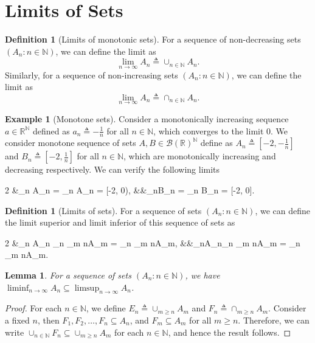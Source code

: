 \documentclass[letterpaper,10pt,english]{article}
\theoremstyle{plain}
\newtheorem{lem}[thm]{Lemma}
\theoremstyle{definition}
\newtheorem{defn}[thm]{Definition}
\newtheorem{exmp}[thm]{Example}
\theoremstyle{remark}
\newcommand{\EQ}[1]{\begin{equation*}#1\end{equation*}}
\newcommand{\meq}[2]{\begin{xalignat*}{#1}#2\end{xalignat*}}
\newcommand{\N}{\mathbb{N}}
\newcommand{\R}{\mathbb{R}}
\newcommand{\sB}{\mathscr{B}}
\renewcommand{\ge}{\geqslant}
\begin{document}
\section{Limits of Sets}
\begin{defn}[Limits of monotonic sets]
For a sequence of non-decreasing sets $(A_n: n \in \N)$, we can define the limit as 
\EQ{
\lim_{n \to \infty}A_n \triangleq \cup_{n \in \N}A_n.
}
Similarly, for a sequence of non-increasing sets $(A_n: n \in \N)$, we can define the limit as 
\EQ{
\lim_{n \to \infty}A_n \triangleq \cap_{n \in \N}A_n.
}
\end{defn}
\begin{shaded}
\begin{exmp}[Monotone sets]
Consider a monotonically increasing sequence $a \in \R^\N$ defined as $a_n \triangleq -\frac{1}{n}$ for all  $n \in \N$,  
which converges to the limit $0$.  
We consider monotone sequence of sets $A, B \in \sB(\R)^\N$ define as $A_n \triangleq [-2, -\frac{1}{n}]$ and $B_n \triangleq [-2, \frac{1}{n}]$  for all $n \in \N$, which are monotonically increasing and decreasing respectively. 
We can verify the following limits 
\meq{2}{
&\lim_n A_n = \cup_{n \in \N}A_n = [-2, 0), &&\lim_nB_n = \cap_{n \in \N}B_n = [-2, 0].
}
\end{exmp}
\end{shaded}
\begin{defn}[Limits of sets] 
For a sequence of sets $(A_n: n \in \N)$, we can define the limit superior and limit inferior of this sequence of sets as 
\meq{2}{
&\limsup_{n \to \infty}A_n \triangleq \cap_{n \in \N}\cup_{m \ge n}A_m = \lim_{n \to \infty}\cup_{m \ge n}A_m,
&&\liminf_{n\to\infty}A_n\triangleq \cup_{n \in \N}\cap_{m \ge n}A_m =  \lim_{n \to \infty}\cap_{m \ge n}A_m.
}
\end{defn}
\begin{lem} 
For a sequence of sets $(A_n: n \in \N)$, we have $\liminf_{n \to \infty}A_n \subseteq \limsup_{n \to \infty}A_n$.  
\end{lem}
\begin{proof}
For each $n \in \N$, we define $E_n \triangleq \cup_{m \ge n}A_m$ and $F_n \triangleq \cap_{m \ge n}A_m$. 
Consider a fixed $n$, then $F_1, F_2, \dots, F_n \subseteq A_n$, and $F_m \subseteq A_m$ for all $m \ge n$. 
Therefore, we can write $\cup_{n \in \N}F_n \subseteq \cup_{m \ge n}A_m$ for each $n \in \N$, 
and hence the result follows. 
\end{proof}
\end{document}
